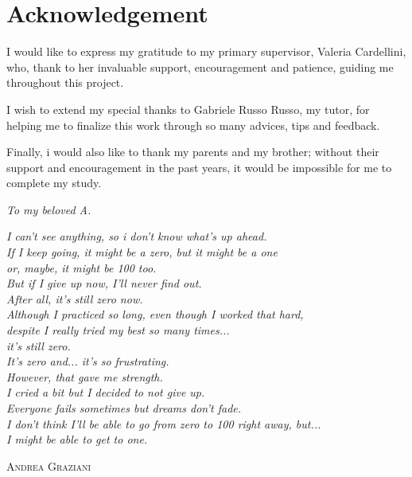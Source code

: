 \documentclass[12pt,a4paper]{report}
\begin{document}
\chapter*{Acknowledgement}

I would like to express my gratitude to my primary supervisor, Valeria Cardellini, who, thank to her invaluable support, encouragement and patience, guiding me throughout this project.

I wish to extend my special thanks to Gabriele Russo Russo, my tutor, for helping me to finalize this work through so many advices, tips and feedback.

Finally, i would also like to thank my parents and my brother; without their support and encouragement in the past years, it would be impossible for me to complete my study. 


\newpage

\setlength{}

\begin{center}
	\textit{To my beloved A.}
\end{center}


\renewcommand{\textflush}{flushright}
\epigraph{\itshape I can't see anything, so i don't know what's up ahead.\\
	If I keep going, it might be a zero, but it might be a one\\ or, maybe, it might be 100 too.\\
	But if I give up now, I'll never find out.\\
	\vspace{\baselineskip}
	After all, it's still zero now.\\
	Although I practiced so long, even though I worked that hard,\\
	despite I really tried my best so many times...\\ it's still zero.\\
	\vspace{\baselineskip}
	It's zero and... it's so frustrating.\\
	\vspace{\baselineskip}
	However, that gave me strength.\\
	I cried a bit but I decided to not give up.\\
	Everyone fails sometimes but dreams don't fade.\\
	\vspace{\baselineskip}
	I don't think I'll be able to go from zero to 100 right away, but...\\ I might be able to get to one.
}{\textsc{Andrea Graziani}}
\end{document}
